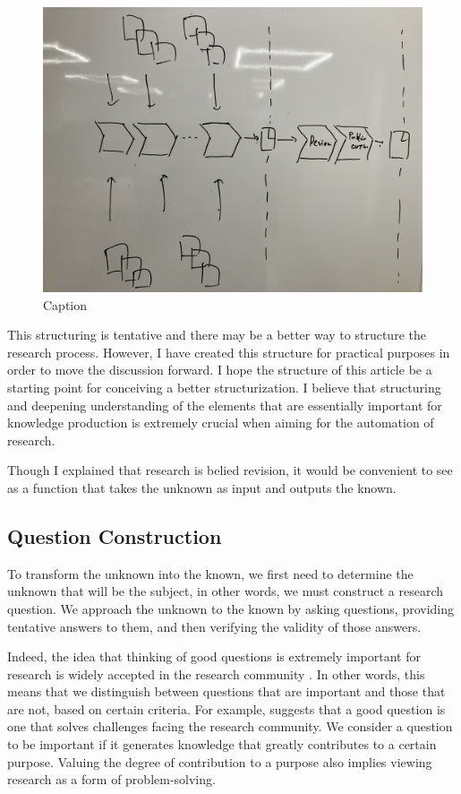 \documentclass{book}
\begin{document}
\begin{figure}[htb]
    \centering
    \includegraphics[width=\textwidth]{figs/researchprocess.jpg}
    \caption{Caption}
    \label{fig:research_process}
\end{figure}


This structuring is tentative and there may be a better way to structure the research process. However, I have created this structure for practical purposes in order to move the discussion forward. I hope the structure of this article be a starting point for conceiving a better structurization. I believe that structuring and deepening understanding of the elements that are essentially important for knowledge production is extremely crucial when aiming for the automation of research.

Though I explained that research is belied revision, it would be convenient to see as a function that takes the unknown as input and outputs the known.  %

\subsection{Question Construction}
To transform the unknown into the known, we first need to determine the unknown that will be the subject, in other words, we must construct a research question. We approach the unknown to the known by asking questions, providing tentative answers to them, and then verifying the validity of those answers. 

Indeed, the idea that thinking of good questions is extremely important for research is widely accepted in the research community \cite{alon2009choose}. In other words, this means that we distinguish between questions that are important and those that are not, based on certain criteria. For example, \cite{alon2009choose} suggests that a good question is one that solves challenges facing the research community. We consider a question to be important if it generates knowledge that greatly contributes to a certain purpose. Valuing the degree of contribution to a purpose also implies viewing research as a form of problem-solving.
\end{document}
